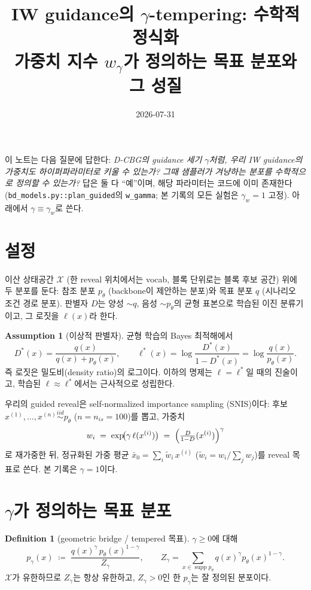 \documentclass[11pt]{article}
\title{IW guidance의 $\gamma$-tempering: 수학적 정식화\\
\large 가중치 지수 $w_\gamma$가 정의하는 목표 분포와 그 성질}
\author{}
\date{2026-07-31}
\newcommand{\code}[1]{\texttt{\small #1}}
\newcommand{\pth}{p_\theta}
\newcommand{\qexc}{q}
\DeclareMathOperator{\supp}{supp}
\theoremstyle{plain}
\theoremstyle{definition}
\newtheorem{definition}{Definition}
\newtheorem{assumption}{Assumption}
\begin{document}
\maketitle

\noindent
이 노트는 다음 질문에 답한다: \emph{D-CBG의 guidance 세기 $\gamma$처럼, 우리 IW guidance의
가중치도 하이퍼파라미터로 키울 수 있는가? 그때 샘플러가 겨냥하는 분포를 수학적으로 정의할 수
있는가?} 답은 둘 다 ``예''이며, 해당 파라미터는 코드에 이미 존재한다
(\code{bd\_models.py::plan\_guided}의 \code{w\_gamma}; 본 기록의 모든 실험은
$\gamma_w = 1$ 고정). 아래에서 $\gamma \equiv \gamma_w$로 쓴다.

\section{설정}

이산 상태공간 $\mathcal{X}$ (한 reveal 위치에서는 vocab, 블록 단위로는 블록 후보 공간) 위에
두 분포를 둔다: 참조 분포 $\pth$ (backbone이 제안하는 분포)와 목표 분포 $\qexc$
(시나리오 조건 경로 분포). 판별자 $D$는 양성 $\sim \qexc$, 음성 $\sim \pth$의 균형
표본으로 학습된 이진 분류기이고, 그 로짓을 $\ell(x)$라 한다.

\begin{assumption}[이상적 판별자]\label{as:ideal}
균형 학습의 Bayes 최적해에서
\[
D^*(x) = \frac{\qexc(x)}{\qexc(x) + \pth(x)}, \qquad
\ell^*(x) = \log\frac{D^*(x)}{1 - D^*(x)} = \log\frac{\qexc(x)}{\pth(x)}.
\]
즉 로짓은 밀도비(density ratio)의 로그이다. 이하의 명제는 $\ell = \ell^*$일 때의 진술이고,
학습된 $\ell \approx \ell^*$에서는 근사적으로 성립한다.
\end{assumption}

우리의 guided reveal은 self-normalized importance sampling (SNIS)이다: 후보
$x^{(1)},\dots,x^{(n)} \overset{iid}{\sim} \pth$ ($n = n_{is} = 100$)를 뽑고, 가중치
\[
w_i \;=\; \exp\!\bigl(\gamma\,\ell(x^{(i)})\bigr)
\;=\;\Bigl(\tfrac{D}{1-D}(x^{(i)})\Bigr)^{\gamma}
\]
로 재가중한 뒤, 정규화된 가중 평균 $\bar{x}_0 = \sum_i \tilde{w}_i\, x^{(i)}$
($\tilde{w}_i = w_i / \sum_j w_j$)를 reveal 목표로 쓴다. 본 기록은 $\gamma = 1$이다.

\section{$\gamma$가 정의하는 목표 분포}

\begin{definition}[geometric bridge / tempered 목표]\label{def:pgamma}
$\gamma \ge 0$에 대해
\[
p_\gamma(x) \;\coloneqq\; \frac{\qexc(x)^{\gamma}\, \pth(x)^{1-\gamma}}{Z_\gamma},
\qquad
Z_\gamma = \sum_{x \in \supp \pth} \qexc(x)^{\gamma} \pth(x)^{1-\gamma}.
\]
$\mathcal{X}$가 유한하므로 $Z_\gamma$는 항상 유한하고, $Z_\gamma > 0$인 한 $p_\gamma$는
잘 정의된 분포이다.
\end{definition}
\end{document}
